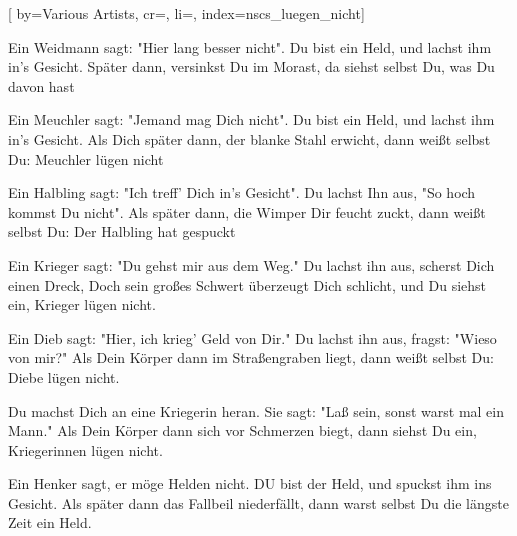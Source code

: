 
[%
    by={Various Artists},
    cr={},
    li={},
    index={nscs_luegen_nicht}]


    \label{nscs_luegen_nicht}

    \beginverse\memorize[verse]
        Ein Weidmann sagt: "Hier lang besser nicht".
        Du bist ein Held, und lachst ihm in's Gesicht.
        Später dann, versinkst Du im Morast,
        da siehst selbst Du, was Du davon hast
    \endverse

    \beginverse\replay[verse]
        Ein Meuchler sagt: "Jemand mag Dich nicht".
        Du bist ein Held, und lachst ihm in's Gesicht.
        Als Dich später dann, der blanke Stahl erwicht,
        dann weißt selbst Du: Meuchler lügen nicht
    \endverse

    \beginverse\replay[verse]
        Ein Halbling sagt: "Ich treff' Dich in's Gesicht".
        Du lachst Ihn aus, "So hoch kommst Du nicht".
        Als später dann, die Wimper Dir feucht zuckt,
        dann weißt selbst Du: Der Halbling hat gespuckt
    \endverse

    \beginverse\replay[verse]
        Ein Krieger sagt: "Du gehst mir aus dem Weg."
        Du lachst ihn aus, scherst Dich einen Dreck,
        Doch sein großes Schwert überzeugt Dich schlicht,
        und Du siehst ein, Krieger lügen nicht.
    \endverse

    \beginverse\replay[verse]
        Ein Dieb sagt: "Hier, ich krieg' Geld von Dir."
        Du lachst ihn aus, fragst: "Wieso von mir?"
        Als Dein Körper dann im Straßengraben liegt,
        dann weißt selbst Du: Diebe lügen nicht.
    \endverse

    \beginverse\replay[verse]
        Du machst Dich an eine Kriegerin heran.
        Sie sagt: "Laß sein, sonst warst mal ein Mann."
        Als Dein Körper dann sich vor Schmerzen biegt,
        dann siehst Du ein, Kriegerinnen lügen nicht.
    \endverse

    \beginverse\replay[verse]
        Ein Henker sagt, er möge Helden nicht.
        DU bist der Held, und spuckst ihm ins Gesicht.
        Als später dann das Fallbeil niederfällt,
        dann warst selbst Du die längste Zeit ein Held.
    \endverse
\endsong
